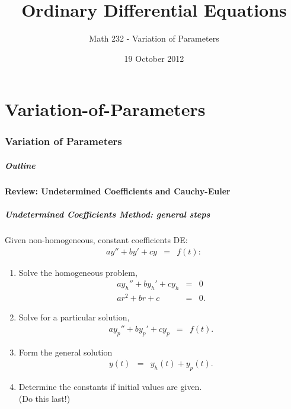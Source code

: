\part{Variation-of-Parameters}
\section{Variation of Parameters}

\title{Ordinary Differential Equations}
\subtitle{Math 232 - Variation of Parameters}
\date{19 October 2012}

\begin{frame}
  \titlepage
\end{frame}

\begin{frame}
  \frametitle{Outline}
  \tableofcontents[ currentsection ]
\end{frame}

\subsection{Review: Undetermined Coefficients and Cauchy-Euler}

\begin{frame}
  \frametitle{Undetermined Coefficients Method: general steps}

  Given non-homogeneous, constant coefficients DE:
  \begin{eqnarray*}
    a y'' + by' + cy & = & f(t):
  \end{eqnarray*}
  \vspace{-0.5cm}
  \begin{enumerate}
  \item Solve the homogeneous problem,
    {\color{blue}\begin{eqnarray*}
      a y_h'' + by_h' + cy_h & = & 0\\
      a r^2 + br + c & = & 0.
    \end{eqnarray*}}
  \vspace{-0.5cm}
  \item Solve for a particular solution,
    {\color{blue}\begin{eqnarray*}
      a y_p'' + by_p' + cy_p & = & f(t).
    \end{eqnarray*}}
  \item Form the general solution
   {\color{red} \begin{eqnarray*}
      y(t) & = & y_h(t) + y_p(t).
    \end{eqnarray*}}
  \item Determine the constants if initial values are given. \\
    (Do this last!)
  \end{enumerate}


\end{frame}

